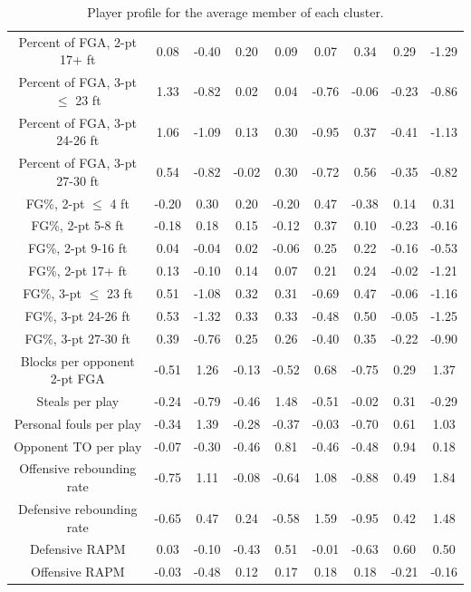 \begin{table}
{\begin{tabular}{ccccccccc}
Percent of FGA, 2-pt 17+ ft    &  0.08 & -0.40 &  0.20 &  0.09 &  0.07 &  0.34 &  0.29 & -1.29 \\
Percent of FGA, 3-pt $\leq$ 23 ft &  1.33 & -0.82 &  0.02 &  0.04 & -0.76 & -0.06 & -0.23 & -0.86 \\
Percent of FGA, 3-pt 24-26 ft  &  1.06 & -1.09 &  0.13 &  0.30 & -0.95 &  0.37 & -0.41 & -1.13 \\
Percent of FGA, 3-pt 27-30 ft  &  0.54 & -0.82 & -0.02 &  0.30 & -0.72 &  0.56 & -0.35 & -0.82 \\
FG\%, 2-pt $\leq$ 4 ft         & -0.20 &  0.30 &  0.20 & -0.20 &  0.47 & -0.38 &  0.14 &  0.31 \\
FG\%, 2-pt 5-8 ft              & -0.18 &  0.18 &  0.15 & -0.12 &  0.37 &  0.10 & -0.23 & -0.16\\
FG\%, 2-pt 9-16 ft             &  0.04 & -0.04 &  0.02 & -0.06 &  0.25 &  0.22 & -0.16 & -0.53\\
FG\%, 2-pt 17+ ft              &  0.13 & -0.10 &  0.14 &  0.07 &  0.21 &  0.24 & -0.02 & -1.21 \\
FG\%, 3-pt $\leq$ 23 ft        &  0.51 & -1.08 &  0.32 &  0.31 & -0.69 &  0.47 & -0.06 & -1.16 \\
FG\%, 3-pt 24-26 ft            &  0.53 & -1.32 &  0.33 &  0.33 & -0.48 &  0.50 & -0.05 & -1.25 \\
FG\%, 3-pt 27-30 ft            &  0.39 & -0.76 &  0.25 &  0.26 & -0.40 &  0.35 & -0.22 & -0.90 \\
Blocks per opponent 2-pt FGA   & -0.51 &  1.26 & -0.13 & -0.52 &  0.68 & -0.75 &  0.29 &  1.37 \\
Steals per play                & -0.24 & -0.79 & -0.46 &  1.48 & -0.51 & -0.02 &  0.31 & -0.29 \\
Personal fouls per play        & -0.34 &  1.39 & -0.28 & -0.37 & -0.03 & -0.70 &  0.61 &  1.03 \\
Opponent TO per play           & -0.07 & -0.30 & -0.46 &  0.81 & -0.46 & -0.48 &  0.94 &  0.18\\
Offensive rebounding rate      & -0.75 &  1.11 & -0.08 & -0.64 &  1.08 & -0.88 &  0.49 &  1.84 \\
Defensive rebounding rate      & -0.65 &  0.47 &  0.24 & -0.58 &  1.59 & -0.95 &  0.42 &  1.48 \\
Defensive RAPM                 &  0.03 & -0.10 & -0.43 &  0.51 & -0.01 & -0.63 &  0.60 &  0.50 \\
Offensive RAPM                 & -0.03 & -0.48 &  0.12 &  0.17 &  0.18 &  0.18 & -0.21 & -0.16 \\
\bottomrule
\end{tabular}
    }
    \caption{Player profile for the average member of each cluster.}
    \label{tab:clus_means}
\end{table}

